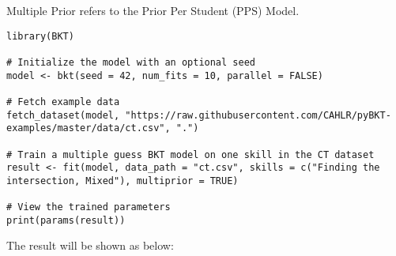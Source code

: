 \documentclass{article}
\begin{document}
Multiple Prior refers to the Prior Per Student (PPS) Model.

\begin{lstlisting}[caption={R code to train a PPS BKT model}]
library(BKT)

# Initialize the model with an optional seed
model <- bkt(seed = 42, num_fits = 10, parallel = FALSE)

# Fetch example data
fetch_dataset(model, "https://raw.githubusercontent.com/CAHLR/pyBKT-examples/master/data/ct.csv", ".")

# Train a multiple guess BKT model on one skill in the CT dataset
result <- fit(model, data_path = "ct.csv", skills = c("Finding the intersection, Mixed"), multiprior = TRUE)

# View the trained parameters
print(params(result))
\end{lstlisting}

The result will be shown as below:
\end{document}
